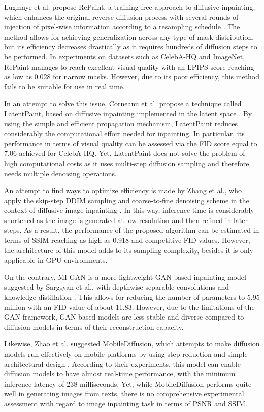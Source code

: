 \documentclass[journal]{IEEEtran}
\begin{document}
Lugmayr et al. propose RePaint, a training-free approach to diffusive inpainting, which enhances the original reverse diffusion process with several rounds of injection of pixel-wise information according to a resampling schedule \cite{lugmayr2022repaint}. The method allows for achieving generalization across any type of mask distribution, but its efficiency decreases drastically as it requires hundreds of diffusion steps to be performed. In experiments on datasets such as CelebA-HQ and ImageNet, RePaint manages to reach excellent visual quality with an LPIPS score reaching as low as 0.028 for narrow masks. However, due to its poor efficiency, this method fails to be suitable for use in real time.

In an attempt to solve this issue, Corneanu et al. propose a technique called LatentPaint, based on diffusive inpainting implemented in the latent space \cite{corneanu2024latentpaint}. By using the simple and efficient propagation mechanism, LatentPaint reduces considerably the computational effort needed for inpainting. In particular, its performance in terms of visual quality can be assessed via the FID score equal to 7.06 achieved for CelebA-HQ. Yet, LatentPaint does not solve the problem of high computational costs as it uses multi-step diffusion sampling and therefore needs multiple denoising operations.

An attempt to find ways to optimize efficiency is made by Zhang et al., who apply the skip-step DDIM sampling and coarse-to-fine denoising scheme in the context of diffusive image inpainting \cite{zhang2024minutes}. In this way, inference time is considerably shortened as the image is generated at low resolution and then refined in later steps. As a result, the performance of the proposed algorithm can be estimated in terms of SSIM reaching as high as 0.918 and competitive FID values. However, the architecture of this model adds to its sampling complexity, besides it is only applicable in GPU environments.

On the contrary, MI-GAN is a more lightweight GAN-based inpainting model suggested by Sargsyan et al., with depthwise separable convolutions and knowledge distillation \cite{sargsyan2023migan}. This allows for reducing the number of parameters to 5.95 million with an FID value of about 11.83. However, due to the limitations of the GAN framework, GAN-based models are less stable and diverse compared to diffusion models in terms of their reconstruction capacity.

Likewise, Zhao et al. suggested MobileDiffusion, which attempts to make diffusion models run effectively on mobile platforms by using step reduction and simple architectural design \cite{zhao2024instant}. According to their experiments, this model can enable diffusion models to have almost real-time performance, with the minimum inference latency of 238 milliseconds. Yet, while MobileDiffusion performs quite well in generating images from texts, there is no comprehensive experimental assessment with regard to image inpainting task in terms of PSNR and SSIM.
\end{document}
